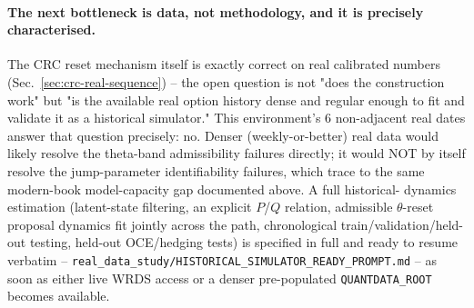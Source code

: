 \paragraph{The next bottleneck is data, not methodology, and it is precisely
characterised.} The CRC reset mechanism itself is exactly correct on real
calibrated numbers (Sec.~\ref{sec:crc-real-sequence}) -- the open question
is not "does the construction work" but "is the available real option
history dense and regular enough to fit and validate it as a historical
simulator." This environment's 6 non-adjacent real dates answer that
question precisely: no. Denser (weekly-or-better) real data would likely
resolve the theta-band admissibility failures directly; it would NOT by
itself resolve the jump-parameter identifiability failures, which trace to
the same modern-book model-capacity gap documented above. A full historical-
dynamics estimation (latent-state filtering, an explicit $P$/$Q$ relation,
admissible $\theta$-reset proposal dynamics fit jointly across the path,
chronological train/validation/held-out testing, held-out OCE/hedging
tests) is specified in full and ready to resume verbatim --
\texttt{real\_data\_study/HISTORICAL\_SIMULATOR\_READY\_PROMPT.md} -- as
soon as either live WRDS access or a denser pre-populated
\texttt{QUANTDATA\_ROOT} becomes available.
